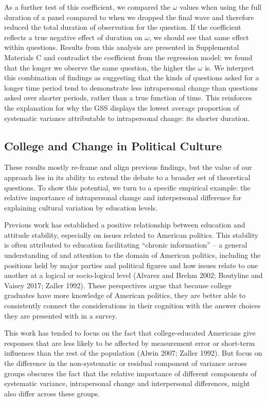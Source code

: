 \documentclass[
  12pt,
]{article}
\begin{document}
As a further test of this coefficient, we compared the \(\omega\) values
when using the full duration of a panel compared to when we dropped the
final wave and therefore reduced the total duration of observation for
the question. If the coefficient reflects a true negative effect of
duration on \(\omega\), we should see that same effect within questions.
Results from this analysis are presented in Supplemental Materials C and
contradict the coefficient from the regression model: we found that the
longer we observe the same question, the higher the \(\omega\) is. We
interpret this combination of findings as suggesting that the kinds of
questions asked for a longer time period tend to demonstrate less
intrapersonal change than questions asked over shorter periods, rather
than a true function of time. This reinforces the explanation for why
the GSS displays the lowest average proportion of systematic variance
attributable to intrapersonal change: its shorter duration.

\hypertarget{college-and-change-in-political-culture}{%
\subsection{College and Change in Political
Culture}\label{college-and-change-in-political-culture}}

These results mostly re-frame and align previous findings, but the value
of our approach lies in its ability to extend the debate to a broader
set of theoretical questions. To show this potential, we turn to a
specific empirical example: the relative importance of intrapersonal
change and interpersonal difference for explaining cultural variation by
education levels.

Previous work has established a positive relationship between education
and attitude stability, especially on issues related to American
politics. This stability is often attributed to education facilitating
``chronic information'' -- a general understanding of and attention to
the domain of American politics, including the positions held by major
parties and political figures and how issues relate to one another at a
logical or socio-logical level (Alvarez and Brehm 2002; Boutyline and
Vaisey 2017; Zaller 1992). These perspectives argue that because college
graduates have more knowledge of American politics, they are better able
to consistently connect the considerations in their cognition with the
answer choices they are presented with in a survey.

This work has tended to focus on the fact that college-educated
Americans give responses that are less likely to be affected by
measurement error or short-term influences than the rest of the
population (Alwin 2007; Zaller 1992). But focus on the difference in the
non-systematic or residual component of variance across groups obscures
the fact that the relative importance of different components of
systematic variance, intrapersonal change and interpersonal differences,
might also differ across these groups.
\end{document}
